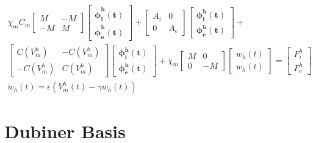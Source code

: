 \documentclass[a4paper,11pt]{article}
\begin{document}
 \begin{equation}\label{block_matrix}
 \begin{gathered}
 \chi_mC_m \begin{bmatrix}M &-M \\ -M & M \end{bmatrix}
	\begin{bmatrix}\bm{\dot{\phi}_i^h(t)} \\ \bm{\dot{\phi}_e^h(t)} \end{bmatrix}
	 + \begin{bmatrix}A_i & 0 \\ 0 & A_e \end{bmatrix}
	 \begin{bmatrix}\bm{\phi_i^h(t)} \\ \bm{\phi_e^h(t)} \end{bmatrix} +\\
	   \begin{bmatrix}C(V_m^h) & -C(V_m^h) \\ -C(V_m^h) & C(V_m^h) \end{bmatrix} 
	   \begin{bmatrix} \bm{\phi_i^h(t)} \\ \bm{\phi_e^h(t)}  \end{bmatrix} 
	   +\chi_m \begin{bmatrix}M & 0 \\ 0 & -M \end{bmatrix} 
	   	\begin{bmatrix}w_h(t) \\ w_h(t) \end{bmatrix} = 
	   	\begin{bmatrix} F_i^h \\ F_e^h\end{bmatrix}\\
	   \dot{w}_h(t)=\epsilon (V_m^h(t)-\gamma w_h(t))
\end{gathered}
\end{equation}
\vspace{5mm}
\section{Dubiner Basis}
\end{document}
